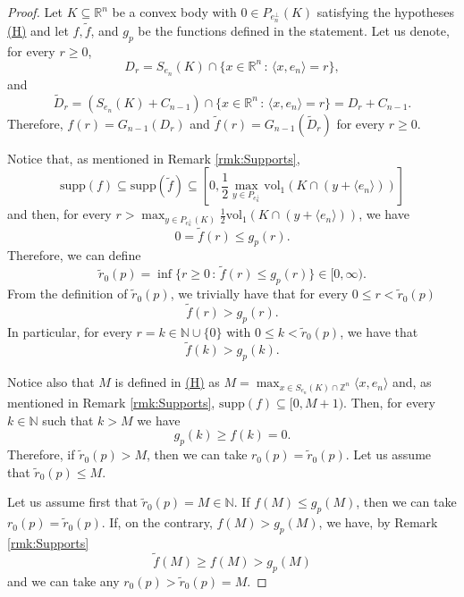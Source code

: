 \documentclass[10pt]{amsart}
\def\R{\mathbb{R}}
\def\N{\mathbb{N}}
\def\Z{\mathbb{Z}}
\def\vol{\mathrm{vol}}
\numberwithin{equation}{section}
\begin{document}
\begin{proof}
Let $K\subseteq\R^n$ be a convex body with $0\in P_{e_n^\perp}(K)$ satisfying the hypotheses \hyperlink{(H)}{(H)} and let $f,\tilde{f}$, and $g_p$ be the functions defined in the statement. Let us denote, for every $r\geq0$,
$$
D_r=S_{e_n}(K)\cap\{x\in\R^n\,:\,\langle x,e_n\rangle=r\},
$$
and
$$
\tilde{D}_r=(S_{e_n}(K)+C_{n-1})\cap\{x\in\R^n\,:\,\langle x,e_n\rangle=r\}=D_r+C_{n-1}.
$$
Therefore, $f(r)=G_{n-1}(D_r)$ and $\tilde{f}(r)=G_{n-1}(\tilde{D}_r)$ for every $r\geq0$.

Notice that, as mentioned in Remark \ref{rmk:Supports},
$$
\textrm{supp}(f)\subseteq\textrm{supp}(\tilde{f})\subseteq\left[0,\frac{1}{2}\max_{y\in P_{e_n^\perp}}\vol_1(K\cap(y+\langle e_n\rangle))\right]
$$
and then, for every $\displaystyle{r>\max_{y\in P_{e_n^\perp}(K)}\frac{1}{2}\vol_1(K\cap(y+\langle e_n\rangle))}$, we have
$$
0=\tilde{f}(r)\leq g_p(r).
$$
Therefore, we can define
$$
\tilde{r}_0(p)=\inf\{r\geq0\,:\,\tilde{f}(r)\leq g_p(r)\}\in[0,\infty).
$$
From the definition of $\tilde{r}_0(p)$, we trivially have that for every $0\leq r<\tilde{r}_0(p)$
$$
\tilde{f}(r)> g_p(r).
$$
In particular, for every $r=k\in\N\cup\{0\}$ with $0\leq k<\tilde{r}_0(p)$, we have that
$$
\tilde{f}(k)>g_p(k).
$$

Notice also that $M$ is defined in \hyperlink{(H)}{(H)} as $\displaystyle{M=\max_{x\in S_{e_n}(K)\cap\Z^n}\langle x, e_n\rangle}$ and, as mentioned in Remark \ref{rmk:Supports}, $\textrm{supp}(f)\subseteq[0, M+1)$. Then, for every $k\in\N$ such that $k>M$ we have
$$
g_p(k)\geq f(k)=0.
$$
Therefore, if $\tilde{r}_0(p)>M$, then we can take $r_0(p)=\tilde{r}_0(p)$. Let us assume that $\tilde{r}_0(p)\leq M$.

Let us assume first that $\tilde{r}_0(p)=M\in\N$. If $f(M)\leq g_p(M)$, then we can take $r_0(p)=\tilde{r}_0(p)$. If, on the contrary, $f(M)>g_p(M)$, we have, by Remark \ref{rmk:Supports}
$$
\tilde{f}(M)\geq f(M)>g_p(M)
$$
and we can take any $r_0(p)>\tilde{r}_0(p)=M$.


\end{proof}
\end{document}
